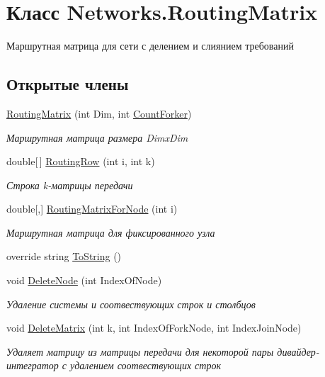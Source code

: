 \hypertarget{class_networks_1_1_routing_matrix}{}\section{Класс Networks.\+Routing\+Matrix}
\label{class_networks_1_1_routing_matrix}


Маршрутная матрица для сети с делением и слиянием требований  


\subsection*{Открытые члены}
\begin{DoxyCompactItemize}
\item 
\hyperlink{class_networks_1_1_routing_matrix_a1fd7f5d451670ee497d9a2f19423cd6f}{Routing\+Matrix} (int Dim, int \hyperlink{class_networks_1_1_routing_matrix_ae2bc6f248f493e8b7e2c7a9973c48cb0}{Count\+Forker})
\begin{DoxyCompactList}\small\item\em Маршрутная матрица размера Dimx\+Dim \end{DoxyCompactList}\item 
double\mbox{[}$\,$\mbox{]} \hyperlink{class_networks_1_1_routing_matrix_aab9c76332f67bd201100fcaaaf6a0664}{Routing\+Row} (int i, int k)
\begin{DoxyCompactList}\small\item\em Строка k-\/матрицы передачи \end{DoxyCompactList}\item 
double\mbox{[},\mbox{]} \hyperlink{class_networks_1_1_routing_matrix_ace46d04d815320a6ed922f273d06f946}{Routing\+Matrix\+For\+Node} (int i)
\begin{DoxyCompactList}\small\item\em Маршрутная матрица для фиксированного узла \end{DoxyCompactList}\item 
override string \hyperlink{class_networks_1_1_routing_matrix_a0ffb0d45b82ffcdb60857497a22b5a69}{To\+String} ()
\item 
void \hyperlink{class_networks_1_1_routing_matrix_aa0c89ec7be267ad6a7dff5d9e5ce3e9b}{Delete\+Node} (int Index\+Of\+Node)
\begin{DoxyCompactList}\small\item\em Удаление системы и соотвествующих строк и столбцов \end{DoxyCompactList}\item 
void \hyperlink{class_networks_1_1_routing_matrix_a90b6115f19d84c00ffa542b614cad426}{Delete\+Matrix} (int k, int Index\+Of\+Fork\+Node, int Index\+Join\+Node)
\begin{DoxyCompactList}\small\item\em Удаляет матрицу из матрицы передачи для некоторой пары дивайдер-\/интегратор с удалением соотвествующих строк \end{DoxyCompactList}\end{DoxyCompactItemize}
